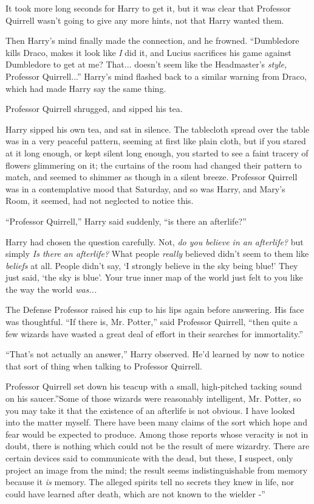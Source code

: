 It took more long seconds for Harry to get it, but it was clear that
Professor Quirrell wasn't going to give any more hints, not that Harry
wanted them.

Then Harry's mind finally made the connection, and he frowned.
``Dumbledore kills Draco, makes it look like \emph{I} did it, and Lucius
sacrifices his game against Dumbledore to get at me? That...
doesn't seem like the Headmaster's \emph{style,} Professor
Quirrell...'' Harry's mind flashed back to a similar warning from
Draco, which had made Harry say the same thing.

Professor Quirrell shrugged, and sipped his tea.

Harry sipped his own tea, and sat in silence. The tablecloth spread over
the table was in a very peaceful pattern, seeming at first like plain
cloth, but if you stared at it long enough, or kept silent long enough,
you started to see a faint tracery of flowers glimmering on it; the
curtains of the room had changed their pattern to match, and seemed to
shimmer as though in a silent breeze. Professor Quirrell was in a
contemplative mood that Saturday, and so was Harry, and Mary's Room, it
seemed, had not neglected to notice this.

``Professor Quirrell,'' Harry said suddenly, ``is there an afterlife?''

Harry had chosen the question carefully. Not, \emph{do you believe in an
afterlife?} but simply \emph{Is there an afterlife?} What people
\emph{really} believed didn't seem to them like \emph{beliefs} at all.
People didn't say, `I strongly believe in the sky being blue!' They just
said, `the sky is blue'. Your true inner map of the world just felt to
you like the way the world \emph{was...}

The Defense Professor raised his cup to his lips again before answering.
His face was thoughtful. ``If there is, Mr. Potter,'' said Professor
Quirrell, ``then quite a few wizards have wasted a great deal of effort
in their searches for immortality.''

``That's not actually an answer,'' Harry observed. He'd learned by now
to notice that sort of thing when talking to Professor Quirrell.

Professor Quirrell set down his teacup with a small, high-pitched
tacking sound on his saucer.''Some of those wizards were reasonably
intelligent, Mr. Potter, so you may take it that the existence of an
afterlife is not obvious. I have looked into the matter myself. There
have been many claims of the sort which hope and fear would be expected
to produce. Among those reports whose veracity is not in doubt, there is
nothing which could not be the result of mere wizardry. There are
certain devices said to communicate with the dead, but these, I suspect,
only project an image from the mind; the result seems indistinguishable
from memory because it \emph{is} memory. The alleged spirits tell no
secrets they knew in life, nor could have learned after death, which are
not known to the wielder -''


